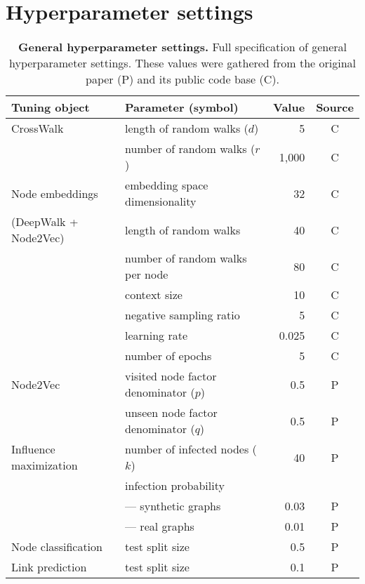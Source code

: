 \clearpage

\section{Hyperparameter settings}
\begin{table}[!htbp]
    \centering
    \begin{tabular}{llrc}
        \toprule
        \textbf{Tuning object} & \textbf{Parameter (symbol)} & \textbf{Value} & \textbf{Source} \\
        \midrule
        CrossWalk & length of random walks ($d$) & 5     & C \\
                  & number of random walks ($r$) & 1,000 & C \\
        \midrule
        Node embeddings       & embedding space dimensionality  & 32  & C \\
        (DeepWalk + Node2Vec) & length of random walks          & 40  & C \\
                              & number of random walks per node & 80  & C \\
                              & context size                    & 10  & C \\
                              & negative sampling ratio         & 5   & C \\
                              & learning rate                   & 0.025 & C \\
                              & number of epochs                & 5  & C \\
        \midrule
        Node2Vec & visited node factor denominator ($p$) & 0.5 & P \\
                 & unseen node factor denominator ($q$)  & 0.5 & P \\
        \midrule
        Influence maximization & number of infected nodes ($k$) & 40   & P \\
                               & infection probability \\
                               & \quad --- synthetic graphs     & 0.03 & P \\
                               & \quad --- real graphs          & 0.01 & P \\
        \midrule
        Node classification & test split size & 0.5 & P \\
        \midrule
        Link prediction & test split size & 0.1 & P \\
        \bottomrule
    \end{tabular}
    \caption{\textbf{General hyperparameter settings.} Full specification of general hyperparameter settings. These values were gathered from the original paper (P) and its public code base (C). }
    \label{tab:hyperparameters}
\end{table}

